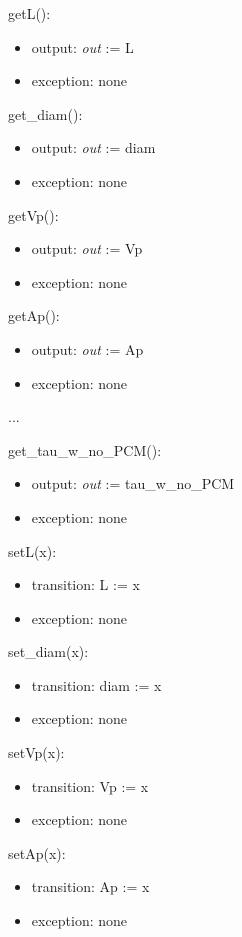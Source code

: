 \documentclass[12pt]{article}
\begin{document}
\noindent getL():
\begin{itemize}
\item output: \textit{out} := L
\item exception: none
\end{itemize}

\noindent get\_diam():
\begin{itemize}
\item output: \textit{out} := diam
\item exception: none
\end{itemize}

\noindent getVp():
\begin{itemize}
\item output: \textit{out} := Vp
\item exception: none
\end{itemize}

\noindent getAp():
\begin{itemize}
\item output: \textit{out} := Ap
\item exception: none
\end{itemize}

...

\noindent get\_tau\_w\_no\_PCM():
\begin{itemize}
\item output: \textit{out} := tau\_w\_no\_PCM
\item exception: none
\end{itemize}

\noindent setL(x):
\begin{itemize}
\item transition: L := x
\item exception: none
\end{itemize}

\noindent set\_diam(x):
\begin{itemize}
\item transition: diam := x
\item exception: none
\end{itemize}

\noindent setVp(x):
\begin{itemize}
\item transition: Vp := x
\item exception: none
\end{itemize}

\noindent setAp(x):
\begin{itemize}
\item transition: Ap := x
\item exception: none
\end{itemize}
\end{document}
